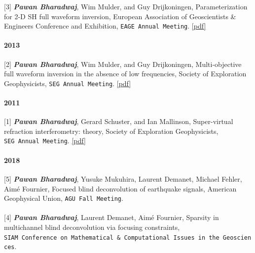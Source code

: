 \documentclass[9pt]{developercv} %
\begin{document}
{[}3{]}
\textbf{\emph{Pawan
Bharadwaj}},
Wim
Mulder,
and Guy
Drijkoningen,
Parameterization
for 2-D SH
full
waveform
inversion,
European
Association
of
Geoscientists
\&
Engineers
Conference
and
Exhibition,
\texttt{EAGE\ Annual\ Meeting}.
\href{https://github.com/pawbz/pawbz.github.io/blob/src/pdf/abstracts/parameterization_EAGE.pdf}{{[}pdf{]}}

\paragraph{2013}\label{section-34}

{[}2{]}
\textbf{\emph{Pawan
Bharadwaj}},
Wim
Mulder,
and Guy
Drijkoningen,
Multi-objective
full
waveform
inversion
in the
absence of
low
frequencies,
Society of
Exploration
Geophysicists,
\texttt{SEG\ Annual\ Meeting}.
\href{https://github.com/pawbz/pawbz.github.io/blob/src/pdf/abstracts/Multi_objectiveFWI.pdf}{{[}pdf{]}}

\paragraph{2011}\label{section-35}

{[}1{]}
\textbf{\emph{Pawan
Bharadwaj}},
Gerard
Schuster,
and Ian
Mallinson,
Super-virtual
refraction
interferometry:
theory,
Society of
Exploration
Geophysicists,
\texttt{SEG\ Annual\ Meeting}.
\href{https://github.com/pawbz/pawbz.github.io/blob/src/pdf/abstracts/SEG_SVITheory.pdf}{{[}pdf{]}}

\label{conference-abstracts}

\paragraph{2018}\label{section-36}

{[}5{]}
\textbf{\emph{Pawan
Bharadwaj}},
Yusuke
Mukuhira,
Laurent
Demanet,
Michael
Fehler,
Aimé
Fournier,
Focused
blind
deconvolution
of
earthquake
signals,
American
Geophysical
Union,
\texttt{AGU\ Fall\ Meeting}.

\paragraph{}\label{section-37}

{[}4{]}
\textbf{\emph{Pawan
Bharadwaj}},
Laurent
Demanet,
Aimé
Fournier,
Sparsity
in
multichannel
blind
deconvolution
via
focusing
constraints,
\texttt{SIAM\ Conference\ on\ Mathematical\ \&\ Computational\ Issues\ in\ the\ Geosciences}.
\end{document}
